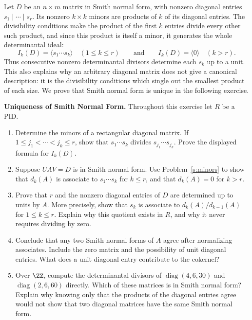 \documentclass[12pt,reqno]{amsart}
\DeclareMathOperator{\diag}{diag}
\begin{document}
Let $D$ be an $n\times m$ matrix in Smith normal form, with nonzero diagonal entries $s_1\mid\cdots\mid s_r$. Its nonzero $k\times k$ minors are products of $k$ of its diagonal entries. The divisibility conditions make the product of the first $k$ entries divide every other such product, and since this product is itself a minor, it generates the whole determinantal ideal:
\[
I_k(D)=\langle s_1\cdots s_k\rangle\quad(1\leq k\leq r)\qquad\text{and}\qquad I_k(D)=\langle0\rangle\quad(k>r).
\]
Thus consecutive nonzero determinantal divisors determine each $s_k$ up to a unit. This also explains why an arbitrary diagonal matrix does not give a canonical description: it is the divisibility conditions which single out the smallest product of each size. We prove that Smith normal form is unique in the following exercise.

\hrulefill

\begin{problems}
\item\label{s:smith} \textbf{Uniqueness of Smith Normal Form.} Throughout this exercise let $R$ be a PID.
\begin{enumerate}
\item Determine the minors of a rectangular diagonal matrix. If $1\leq j_1<\cdots<j_k\leq r$, show that $s_1\cdots s_k$ divides $s_{j_1}\cdots s_{j_k}$. Prove the displayed formula for $I_k(D)$.
\item Suppose $UAV=D$ is in Smith normal form. Use Problem~\ref{s:minors} to show that $d_k(A)$ is associate to $s_1\cdots s_k$ for $k\leq r$, and that $d_k(A)=0$ for $k>r$.
\item Prove that $r$ and the nonzero diagonal entries of $D$ are determined up to units by $A$. More precisely, show that $s_k$ is associate to $d_k(A)/d_{k-1}(A)$ for $1\leq k\leq r$. Explain why this quotient exists in $R$, and why it never requires dividing by zero.
\item Conclude that any two Smith normal forms of $A$ agree after normalizing associates. Include the zero matrix and the possibility of unit diagonal entries. What does a unit diagonal entry contribute to the cokernel?
\item Over $\ZZ$, compute the determinantal divisors of $\diag(4,6,30)$ and $\diag(2,6,60)$ directly. Which of these matrices is in Smith normal form? Explain why knowing only that the products of the diagonal entries agree would not show that two diagonal matrices have the same Smith normal form.
\end{enumerate}
\end{problems}
\end{document}
